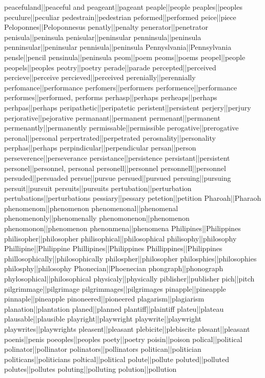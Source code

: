 peacefuland||peaceful and
peageant||pageant
peaple||people
peaples||peoples
peculure||peculiar
pedestrain||pedestrian
peformed||performed
peice||piece
Peloponnes||Peloponnesus
penatly||penalty
penerator||penetrator
penisula||peninsula
penisular||peninsular
penninsula||peninsula
penninsular||peninsular
pennisula||peninsula
Pennyslvania||Pennsylvania
pensle||pencil
pensinula||peninsula
peom||poem
peoms||poems
peopel||people
peopels||peoples
peotry||poetry
perade||parade
percepted||perceived
percieve||perceive
percieved||perceived
perenially||perennially
perfomance||performance
perfomers||performers
performence||performance
performes||performed, performs
perhasp||perhaps
perheaps||perhaps
perhpas||perhaps
peripathetic||peripatetic
peristent||persistent
perjery||perjury
perjorative||pejorative
permanant||permanent
permenant||permanent
permenantly||permanently
permissable||permissible
perogative||prerogative
peronal||personal
perpertrated||perpetrated
perosnality||personality
perphas||perhaps
perpindicular||perpendicular
persan||person
perseverence||perseverance
persistance||persistence
persistant||persistent
personel||personnel, personal
personell||personnel
personnell||personnel
persuded||persuaded
persue||pursue
persued||pursued
persuing||pursuing
persuit||pursuit
persuits||pursuits
pertubation||perturbation
pertubations||perturbations
pessiary||pessary
petetion||petition
Pharoah||Pharaoh
phenomenom||phenomenon
phenomenonal||phenomenal
phenomenonly||phenomenally
phenomonenon||phenomenon
phenomonon||phenomenon
phenonmena||phenomena
Philipines||Philippines
philisopher||philosopher
philisophical||philosophical
philisophy||philosophy
Phillipine||Philippine
Phillipines||Philippines
Phillippines||Philippines
phillosophically||philosophically
philospher||philosopher
philosphies||philosophies
philosphy||philosophy
Phonecian||Phoenecian
phongraph||phonograph
phylosophical||philosophical
physicaly||physically
piblisher||publisher
pich||pitch
pilgrimmage||pilgrimage
pilgrimmages||pilgrimages
pinapple||pineapple
pinnaple||pineapple
pinoneered||pioneered
plagarism||plagiarism
planation||plantation
planed||planned
plantiff||plaintiff
plateu||plateau
plausable||plausible
playright||playwright
playwrite||playwright
playwrites||playwrights
pleasent||pleasant
plebicite||plebiscite
plesant||pleasant
poenis||penis
poeoples||peoples
poety||poetry
poisin||poison
polical||political
polinator||pollinator
polinators||pollinators
politican||politician
politicans||politicians
poltical||political
polute||pollute
poluted||polluted
polutes||pollutes
poluting||polluting
polution||pollution
